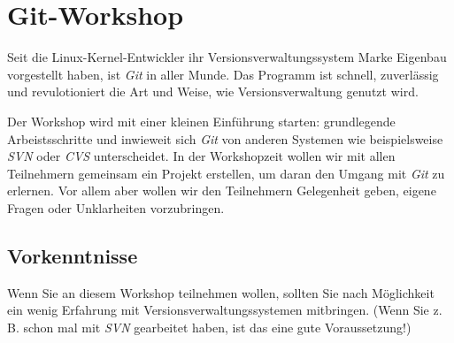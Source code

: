 \documentclass[11pt,            %
               a4paper,         %
               oneside,         %
               DIV14,           %
               fleqn,           %
               smallheadings,   %
               halfparskip,     %
               nochapterprefix, %
               bibtotocnumbered,%
              ]{scrartcl} %
\begin{document}
%
%
%





\section*{Git-Workshop}

Seit die Linux-Kernel-Entwickler ihr Versionsverwaltungssystem Marke
Eigenbau vorgestellt haben, ist \emph{Git} in aller Munde. Das
Programm ist schnell, zuverlässig und revulotioniert die Art und
Weise, wie Versionsverwaltung genutzt wird.

Der Workshop wird mit einer kleinen Einführung starten: grundlegende
Arbeistsschritte und inwieweit sich \emph{Git} von anderen Systemen
wie beispielsweise \emph{SVN} oder \emph{CVS} unterscheidet.
In der Workshopzeit wollen wir mit allen Teilnehmern gemeinsam ein
Projekt erstellen, um daran den Umgang mit \emph{Git} zu erlernen.
Vor allem aber wollen wir den Teilnehmern Gelegenheit geben, eigene
Fragen oder Unklarheiten vorzubringen.

\subsection*{Vorkenntnisse}

Wenn Sie an diesem Workshop teilnehmen wollen, sollten Sie nach
Möglichkeit ein wenig Erfahrung mit Versionsverwaltungssystemen
mitbringen. (Wenn Sie z.\,B. schon mal mit \emph{SVN} gearbeitet
haben, ist das eine gute Voraussetzung!)
\end{document}
